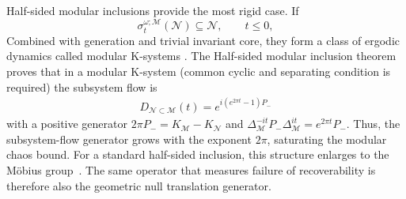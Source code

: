 \documentclass[a4paper,11pt]{article}
\theoremstyle{definition}
\newcommand{\mN}{\mathcal{N}}
\newcommand{\mM}{\mathcal{M}}
\begin{document}
Half-sided modular inclusions provide the most rigid case.  If
\begin{equation}
    \sigma_t^{\omega;\mM}(\mN)\subseteq\mN,
    \qquad t\leq0,
\end{equation}
Combined with generation and trivial invariant core, they form a class of ergodic dynamics called modular K-systems \cite{ouseph2024local}. The Half-sided modular inclusion theorem proves that in a modular K-system (common cyclic and separating condition is required) the subsystem flow is
\begin{align}\label{borchers}
    D_{\mN\subset\mM}(t)=e^{i (e^{2\pi t}-1)P_-}
\end{align}
with a positive generator $2\pi P_-=K_{\mM}-K_{\mN}$ and $ \Delta_{\mM}^{-it}P_-\Delta_{\mM}^{it}=e^{2\pi t}P_-$. Thus, the subsystem-flow generator grows with the exponent $2\pi$, saturating the modular chaos bound.  For a standard half-sided inclusion, this structure enlarges to the M\"obius group~\cite{Wiesbrock1993b,GuidoLongoWiesbrock1998,LashkariLeungMoosaOuseph2025}.  The same operator that measures failure of recoverability is therefore also the geometric null translation generator.
\end{document}
